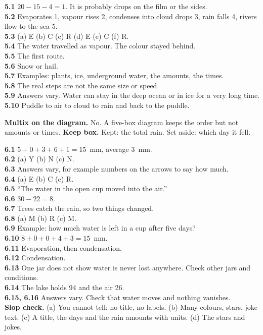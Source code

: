 \textbf{5.1} $20-15-4=1$. It is probably drops on the film or the sides.\\
\textbf{5.2} Evaporates 1, vapour rises 2, condenses into cloud drops 3, rain falls 4, rivers flow to the sea 5.\\
\textbf{5.3} (a) E (b) C (c) R (d) E (e) C (f) R.\\
\textbf{5.4} The water travelled as vapour. The colour stayed behind.\\
\textbf{5.5} The first route.\\
\textbf{5.6} Snow or hail.\\
\textbf{5.7} Examples: plants, ice, underground water, the amounts, the times.\\
\textbf{5.8} The real steps are not the same size or speed.\\
\textbf{5.9} Answers vary. Water can stay in the deep ocean or in ice for a very long time.\\
\textbf{5.10} Puddle to air to cloud to rain and back to the puddle.

\textbf{Multix on the diagram.} No. A five-box diagram keeps the order but not amounts or times. \textbf{Keep box.} Kept: the total rain. Set aside: which day it fell.

\textbf{6.1} $5+0+3+6+1=15$~mm, average 3~mm.\\
\textbf{6.2} (a) Y (b) N (c) N.\\
\textbf{6.3} Answers vary, for example numbers on the arrows to say how much.\\
\textbf{6.4} (a) E (b) C (c) R.\\
\textbf{6.5} ``The water in the open cup moved into the air.''\\
\textbf{6.6} $30-22=8$.\\
\textbf{6.7} Trees catch the rain, so two things changed.\\
\textbf{6.8} (a) M (b) R (c) M.\\
\textbf{6.9} Example: how much water is left in a cup after five days?\\
\textbf{6.10} $8+0+0+4+3=15$~mm.\\
\textbf{6.11} Evaporation, then condensation.\\
\textbf{6.12} Condensation.\\
\textbf{6.13} One jar does not show water is never lost anywhere. Check other jars and conditions.\\
\textbf{6.14} The lake holds 94 and the air 26.\\
\textbf{6.15, 6.16} Answers vary. Check that water moves and nothing vanishes.\\
\textbf{Slop check.} (a) You cannot tell: no title, no labels. (b) Many colours, stars, joke text. (c) A title, the days and the rain amounts with units. (d) The stars and jokes.

